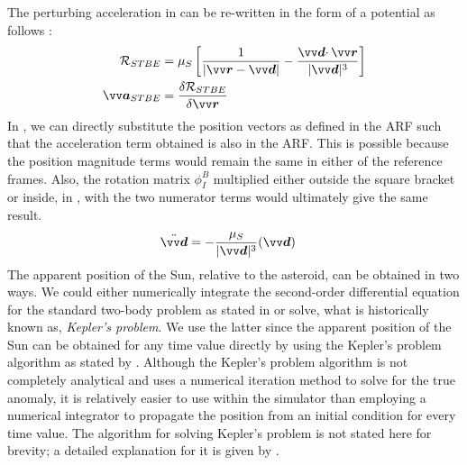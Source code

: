 The perturbing acceleration in  can be re-written in the form of a potential as follows \parencite{scheeresBook}:
\begin{align}
    \mathcal{R}_{STBE} &= \mu_S \left[\frac{1}{|\bv{r} - \bv{d}|} - \frac{\bv{d}\cdotp\bv{r}}{|\bv{d}|^3} \right]
    \label{eqn:stbe_potential} \\
    \bv{a}_{STBE} &= \frac{\delta \mathcal{R}_{STBE}}{\delta\bv{r}}
\end{align}
In , we can directly substitute the position vectors as defined in the \gls{ARF} such that the acceleration term obtained is also in the \gls{ARF}. This is possible because the position magnitude terms would remain the same in either of the reference frames. Also, the rotation matrix $\phi_I^B$ multiplied either outside the square bracket or inside, in , with the two numerator terms would ultimately give the same result.
\begin{align}
    \ddot{\bv{d}} &= -\frac{\mu_S}{|\bv{d}|^3} (\bv{d})
    \label{eqn:sun_around_asteroid}
\end{align}
The apparent position of the Sun, relative to the asteroid, can be obtained in two ways. We could either numerically integrate the second-order differential equation for the standard two-body problem as stated in  or solve, what is historically known as, \textit{Kepler's problem}. We use the latter since the apparent position of the Sun can be obtained for any time value directly by using the Kepler's problem algorithm as stated by \cite{chobotovBook}. Although the Kepler's problem algorithm is not completely analytical and uses a numerical iteration method to solve for the true anomaly, it is relatively easier to use within the simulator than employing a numerical integrator to propagate the position from an initial condition for every time value. The algorithm for solving Kepler's problem is not stated here for brevity; a detailed explanation for it is given by \cite{chobotovBook}.

